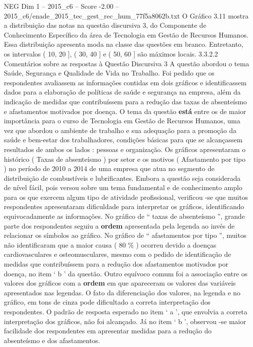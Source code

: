 \begin{textsample}{NEG Dim 1 – 2015\_c6 – Score -2.00 – 2015\_c6/enade\_2015\_tec\_gest\_rec\_hum\_77f5a8062b.txt}
O Gráfico 3.11 mostra a distribuição das notas na questão discursiva 3, do Componente de Conhecimento Específico da área de Tecnologia em Gestão de Recursos Humanos.
Essa distribuição apresenta moda na classe das questões em branco.
Entretanto, os intervalos ( 10, 20 ], ( 30, 40 ] e ( 50, 60 ] são máximos locais. 3.3.2.2 Comentários sobre as respostas à Questão Discursiva 3 A questão abordou o tema Saúde, Segurança e Qualidade de Vida no Trabalho.
Foi pedido que os respondentes avaliassem as informações contidas em dois gráficos e identificassem dados para a elaboração de políticas de saúde e segurança na empresa, além da indicação de medidas que contribuíssem para a redução das taxas de absenteísmo e afastamentos motivados por doença.
O tema da questão \textbf{está} entre os de maior importância para o curso de Tecnologia em Gestão de Recursos Humanos, uma vez que abordou o ambiente de trabalho e sua adequação para a promoção da saúde e bem-estar dos trabalhadores, condições básicas para que se alcançassem resultados de ambos os lados : pessoas e organização.
Os gráficos apresentaram o histórico ( Taxas de absenteísmo ) por setor e os motivos ( Afastamento por tipo ) no período de 2010 a 2014 de uma empresa que atua no segmento de distribuição de combustíveis e lubrificantes.
Embora a questão seja considerada de nível fácil, pois versou sobre um tema fundamental e de conhecimento amplo para os que exercem algum tipo de atividade profissional, verificou -se que muitos respondentes apresentaram dificuldade para interpretar os gráficos, identificando equivocadamente as informações.
No gráfico de “ taxas de absenteísmo ”, grande parte dos respondentes seguiu a \textbf{ordem} apresentada pela legenda ao invés de relacionar os símbolos ao gráfico.
No gráfico de “ afastamentos por tipo ”, muitos não identificaram que a maior causa ( 80 \% ) ocorreu devido a doenças cardiovasculares e osteomusculares, mesmo com o pedido de identificação de medidas que contribuíssem para a redução dos afastamentos motivados por doença, no item ‘ b ’ da questão.
Outro equívoco comum foi a associação entre os valores dos gráficos com a \textbf{ordem} em que apareceram os valores das variáveis apresentados nas legendas.
O fato da diferenciação dos valores, na legenda e no gráfico, em tons de cinza pode dificultado a correta interpretação dos respondentes.
O padrão de resposta esperado no item ‘ a ’, que envolvia a correta interpretação dos gráficos, não foi alcançado.
Já no item ‘ b ’, observou -se maior facilidade dos respondentes em apresentar medidas para a redução do absenteísmo e dos afastamentos.

\end{textsample}
